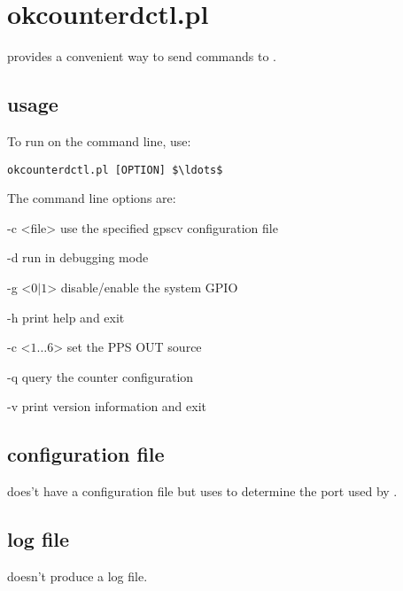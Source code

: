 \section{okcounterdctl.pl \label{s:okcounterdctl}}

 provides a convenient way to send commands to .

\subsection{usage}

To run  on the command line, use:
\begin{lstlisting}[mathescape=true]
okcounterdctl.pl [OPTION] $\ldots$
\end{lstlisting}
The command line options are:
\begin{description*}
	\item[-c \textless file\textgreater] use the specified gpscv configuration file
	\item[-d]	run in debugging mode
	\item[-g \textless $0|1$\textgreater] disable/enable the system GPIO
	\item[-h]	print help and exit
	\item[-c \textless $1\ldots6$\textgreater] set the PPS OUT source
	\item[-q] query the counter configuration
	\item[-v]	print version information and exit
\end{description*}

\subsection{configuration file}

 does't have a configuration file but uses
 to determine the port used by .

\subsection{log file}

 doesn't produce a log file.